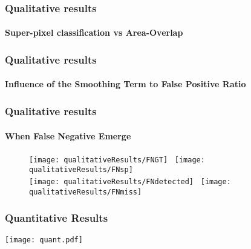 \graphicspath{{chapters/method/figures/}}

\begin{frame}
  \frametitle{Qualitative results}
  \framesubtitle{Super-pixel classification vs Area-Overlap}
  \begin{figure}[Htbp]
    \centering
    \hspace*{\fill}%
      \label{fig:dataTermb}%
      \hfill%

      \label{fig:dataTermc}%
      \hspace*{\fill}%
        \label{fig:dataTerm}%
  \end{figure}
\end{frame}

\begin{frame}\frametitle{Qualitative results}
\framesubtitle{\footnotesize Influence of the Smoothing Term to False Positive Ratio}
\vspace{-10pt}
\begin{figure}[Htbp]
\setlength{\abovecaptionskip}{2pt}
\centering
{}

\end{figure}
\end{frame}

\begin{frame}[plain]\frametitle{Qualitative results}
\framesubtitle{When False Negative Emerge}
\vspace{-5pt}
\begin{figure}[Htbp]
\setlength{\abovecaptionskip}{2pt}
\centering
\texttt{[image: qualitativeResults/FNGT]}~ 
\texttt{[image: qualitativeResults/FNsp]}\\ \vspace{3pt}
\texttt{[image: qualitativeResults/FNdetected]}~ 
\texttt{[image: qualitativeResults/FNmiss]}
\end{figure}
\end{frame}


\begin{frame}[plain]\frametitle{Quantitative Results}
\texttt{[image: quant.pdf]} 
\end{frame}
